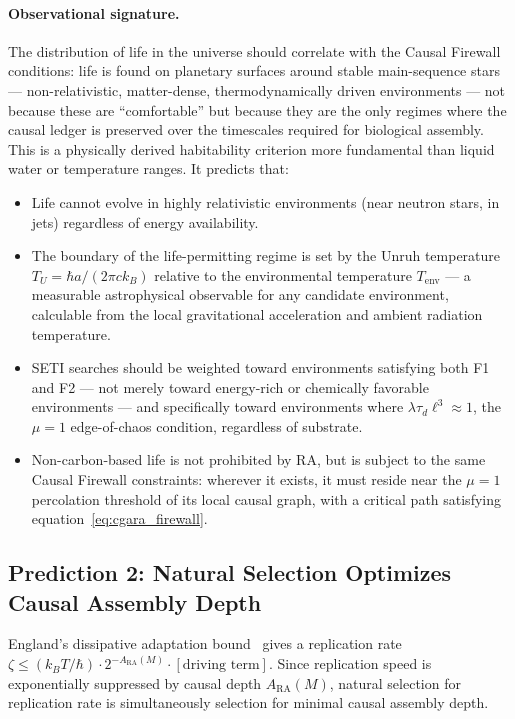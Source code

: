 \documentclass[11pt,a4paper]{article}
\theoremstyle{plain}
\theoremstyle{definition}
\theoremstyle{remark}
\newcommand{\ARA}{A_{\mathrm{RA}}}
\begin{document}
\paragraph{Observational signature.}
The distribution of life in the universe should correlate with the Causal Firewall
conditions: life is found on planetary surfaces around stable main-sequence stars
--- non-relativistic, matter-dense, thermodynamically driven environments --- not
because these are ``comfortable'' but because they are the only regimes where the
causal ledger is preserved over the timescales required for biological assembly.
This is a physically derived habitability criterion more fundamental than liquid
water or temperature ranges. It predicts that:
\begin{itemize}
  \item Life cannot evolve in highly relativistic environments (near neutron stars,
  in jets) regardless of energy availability.
  \item The boundary of the life-permitting regime is set by the Unruh temperature
  $T_U = \hbar a / (2\pi c k_B)$ relative to the environmental temperature
  $T_{\mathrm{env}}$ --- a measurable astrophysical observable for any candidate
  environment, calculable from the local gravitational acceleration and ambient
  radiation temperature.
  \item SETI searches should be weighted toward environments satisfying both F1
  and F2 --- not merely toward energy-rich or chemically favorable environments
  --- and specifically toward environments where $\lambda\tau_d\ell^3 \approx 1$,
  the $\mu = 1$ edge-of-chaos condition, regardless of substrate.
  \item Non-carbon-based life is not prohibited by RA, but is subject to the same
  Causal Firewall constraints: wherever it exists, it must reside near the $\mu=1$
  percolation threshold of its local causal graph, with a critical path satisfying
  equation~\eqref{eq:cgara_firewall}.
\end{itemize}

\subsection{Prediction 2: Natural Selection Optimizes Causal Assembly Depth}

England's dissipative adaptation bound~\citep{England2013} gives a replication
rate $\zeta \leq (k_BT/\hbar) \cdot 2^{-\ARA(M)} \cdot [\text{driving term}]$.
Since replication speed is exponentially suppressed by causal depth $\ARA(M)$,
natural selection for replication rate is simultaneously selection for minimal
causal assembly depth.
\end{document}
